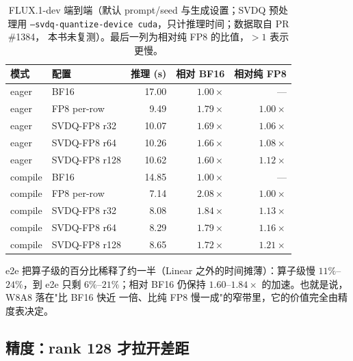 \begin{table}[H]
\centering\small
\caption{FLUX.1-dev 端到端（默认 prompt/seed 与生成设置；SVDQ 预处理用
\texttt{--svdq-quantize-device cuda}，只计推理时间；数据取自 PR \#1384，
本书未复测）。最后一列为相对纯 FP8 的比值，$>1$ 表示更慢。}
\label{tab:40b-e2e}
\begin{tabular}{@{}llrrr@{}}
\toprule
模式 & 配置 & 推理 (s) & 相对 BF16 & 相对纯 FP8 \\
\midrule
eager   & BF16         & 17.00 & $1.00\times$ & --- \\
eager   & FP8 per-row  &  9.49 & $1.79\times$ & $1.00\times$ \\
eager   & SVDQ-FP8 r32 & 10.07 & $1.69\times$ & $1.06\times$ \\
eager   & SVDQ-FP8 r64 & 10.26 & $1.66\times$ & $1.08\times$ \\
eager   & SVDQ-FP8 r128& 10.62 & $1.60\times$ & $1.12\times$ \\
compile & BF16         & 14.85 & $1.00\times$ & --- \\
compile & FP8 per-row  &  7.14 & $2.08\times$ & $1.00\times$ \\
compile & SVDQ-FP8 r32 &  8.08 & $1.84\times$ & $1.13\times$ \\
compile & SVDQ-FP8 r64 &  8.29 & $1.79\times$ & $1.16\times$ \\
compile & SVDQ-FP8 r128&  8.65 & $1.72\times$ & $1.21\times$ \\
\bottomrule
\end{tabular}
\end{table}

e2e 把算子级的百分比稀释了约一半（Linear 之外的时间摊薄）：算子级慢
$11\%$--$24\%$，到 e2e 只剩 $6\%$--$21\%$；相对 BF16 仍保持
$1.60$--$1.84\times$ 的加速。也就是说，W8A8 落在"比 BF16 快近
一倍、比纯 FP8 慢一成"的窄带里，它的价值完全由精度表决定。

\subsection{精度：rank 128 才拉开差距}

